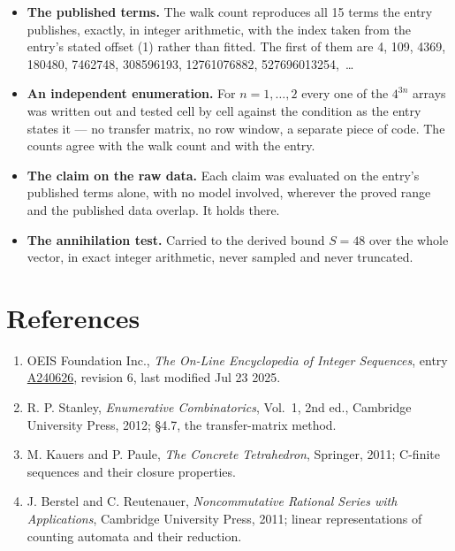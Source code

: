 \documentclass[11pt]{article}
\theoremstyle{definition}
\begin{document}
\begin{itemize}

\item {\bfseries The published terms.} The walk count reproduces all 15 terms the entry publishes, exactly, in integer arithmetic, with the index taken from the entry's stated offset (1) rather than fitted. The first of them are 4, 109, 4369, 180480, 7462748, 308596193, 12761076882, 527696013254,~\dots

\item {\bfseries An independent enumeration.} For $n = 1,\dots,2$ every one of the $4^{3n}$ arrays was written out and tested cell by cell against the condition as the entry states it --- no transfer matrix, no row window, a separate piece of code. The counts agree with the walk count and with the entry.

\item {\bfseries The claim on the raw data.} Each claim was evaluated on the entry's published terms alone, with no model involved, wherever the proved range and the published data overlap. It holds there.

\item {\bfseries The annihilation test.} Carried to the derived bound $S = 48$ over the whole vector, in exact integer arithmetic, never sampled and never truncated.

\end{itemize}

\section{References}

\begin{enumerate}

\item OEIS Foundation Inc., \emph{The On-Line Encyclopedia of Integer Sequences}, entry \href{https://oeis.org/A240626}{A240626}, revision 6, last modified Jul 23 2025.

\item R. P. Stanley, \emph{Enumerative Combinatorics}, Vol.~1, 2nd ed., Cambridge University Press, 2012; \S4.7, the transfer-matrix method.

\item M. Kauers and P. Paule, \emph{The Concrete Tetrahedron}, Springer, 2011; C-finite sequences and their closure properties.

\item J. Berstel and C. Reutenauer, \emph{Noncommutative Rational Series with Applications}, Cambridge University Press, 2011; linear representations of counting automata and their reduction.

\end{enumerate}
\end{document}
